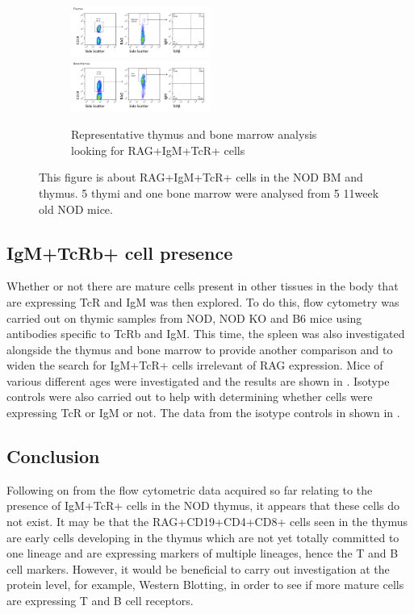 \begin{figure}
	\begin{subfigure}{\textwidth}
	\includegraphics[width=0.5\textwidth]{Figures/Thy3RAGIgMTcR.png}
	\includegraphics[width=0.5\textwidth]{Figures/BMRAGIgMTcR.png}
	\caption{Representative thymus and bone marrow analysis looking for RAG+IgM+TcR+ cells}
	\label{subfig:BMvThyRAGIgMTcR}
	\end{subfigure}
\caption{This figure is about RAG+IgM+TcR+ cells in the NOD BM and thymus. 5 thymi and one bone marrow were analysed from 5 11week old NOD mice.}
\label{fig:RAGIgMTcRpos}
\end{figure}

\subsection{IgM+TcRb+ cell presence}

Whether or not there are mature cells present in other tissues in the body that are expressing TcR and IgM was then explored.
To do this, flow cytometry was carried out on thymic samples from NOD, NOD KO and B6 mice using antibodies specific to TcRb and IgM.
This time, the spleen was also investigated alongside the thymus and bone marrow to provide another comparison and to widen the search for IgM+TcR+ cells irrelevant of RAG expression.
Mice of various different ages were investigated and the results are shown in  .
Isotype controls were also carried out to help with determining whether cells were expressing TcR or IgM or not.
The data from the isotype controls in shown in .


\subsection{Conclusion}
Following on from the flow cytometric data acquired so far relating to the presence of IgM+TcR+ cells in the NOD thymus, it appears that these cells do not exist. 
It may be that the RAG+CD19+CD4+CD8+ cells seen in the thymus are early cells developing in the thymus which are not yet totally committed to one lineage and are expressing markers of multiple lineages, hence the T and B cell markers.
However, it would be beneficial to carry out investigation at the protein level, for example, Western Blotting, in order to see if more mature cells are expressing T and B cell receptors.




